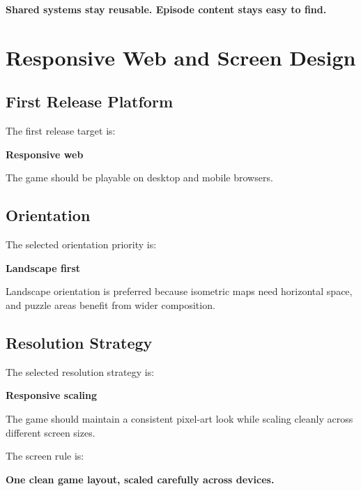 \documentclass[12pt]{article}
\begin{document}
\begin{center}
\textbf{Shared systems stay reusable. Episode content stays easy to find.}
\end{center}

\section{Responsive Web and Screen Design}

\subsection{First Release Platform}

The first release target is:

\begin{center}
\textbf{Responsive web}
\end{center}

The game should be playable on desktop and mobile browsers.

\subsection{Orientation}

The selected orientation priority is:

\begin{center}
\textbf{Landscape first}
\end{center}

Landscape orientation is preferred because isometric maps need horizontal space, and puzzle areas benefit from wider composition.

\subsection{Resolution Strategy}

The selected resolution strategy is:

\begin{center}
\textbf{Responsive scaling}
\end{center}

The game should maintain a consistent pixel-art look while scaling cleanly across different screen sizes.

The screen rule is:

\begin{center}
\textbf{One clean game layout, scaled carefully across devices.}
\end{center}
\end{document}
